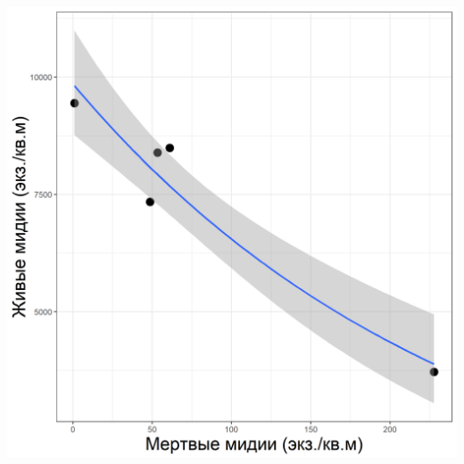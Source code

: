 \documentclass[20pt,a0,portrait]{a0poster}
\begin{document}
\begin{minipage}[t]{0.5\linewidth}
\begin{minipage}[t]{0.46\linewidth}
\begin{center}
			\includegraphics[width=0.9\linewidth]{N_dead_N_alive_hem.png}
			\label{Nalive_Ndead_hem}
		\end{center}\vspace{0.5cm}
\end{minipage}



\end{minipage}
\end{document}

